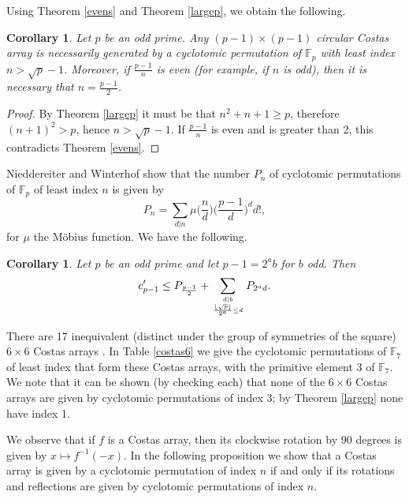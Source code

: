 \documentclass[10pt]{amsart}
\newtheorem{corollary}[theorem]{Corollary}
\newcommand{\comment}[1]{}
\begin{document}
Using Theorem \ref{evens} and Theorem \ref{largep}, we obtain the
following.

\begin{corollary}
Let $p$ be an odd prime. Any $(p-1)\times
(p-1)$ circular Costas array is necessarily generated by a cyclotomic permutation of
$\mathbb{F}_p$ with least index $n>\sqrt{p}-1$. Moreover, if
$\frac{p-1}{n}$ is even (for example, if $n$ is odd), then it is
necessary that $n=\frac{p-1}{2}$.
\end{corollary}
\begin{proof}
By Theorem \ref{largep} it must be that $n^2+n+1 \geq p$,
therefore $(n+1)^2 > p$, hence $n > \sqrt{p}-1$. If
$\frac{p-1}{n}$ is even and is greater than 2, this contradicts
Theorem \ref{evens}.
\end{proof}

Nieddereiter and Winterhof \cite{MR2143454} show that
the number $P_n$ of cyclotomic
permutations of $\mathbb{F}_p$ of least index $n$ is given by
\[
P_n=\sum_{d|n} \mu\Big(\frac{n}{d}\Big)\Big(\frac{p-1}{d}\Big)^d d!,
\]
for $\mu$ the M\"obius function. We have the following.

\begin{corollary}
Let $p$ be an odd prime and let $p-1=2^ab$ for $b$ odd. Then
\[
c_{p-1}' \leq P_{\frac{p-1}{2}} + \sum_{d|b \atop
\frac{\lfloor \sqrt{p}\rfloor }{2^a} \leq d} P_{2^a d}.
\]
\end{corollary}

\comment{
If $p \equiv 1 \pmod 4$, then
\[ c_{p-1} \leq  P_{\frac{p-1}{2}}
+\sum_{\substack{\lfloor \sqrt{p} \rfloor \leq 2n \leq
p-1\\2n|p-1}} P_{2n},
\] and if $p \equiv -1 \pmod 4$, then
\[ c_{p-1} \leq \sum_{\substack{\lfloor \sqrt{p} \rfloor \leq 2n \leq p-1\\2n|p-1}}  P_{2n}. \]
\end{corollary}}

There are 17 inequivalent (distinct under the group of symmetries
of the square) $6 \times 6$ Costas arrays \cite{golomb1984}. In
Table \ref{costas6} we give the cyclotomic permutations of
$\mathbb{F}_7$ of least index that form  these  Costas arrays, with the
primitive element 3 of $\mathbb{F}_7$.
We note that it can be shown (by checking each) that none of the
$6 \times 6$ Costas arrays are given by cyclotomic permutations of
index 3; by Theorem \ref{largep} none have index 1.

We observe that if $f$ is a Costas array, then
its clockwise rotation by 90 degrees is given by $x \mapsto f^{-1}(-x)$.
In the following proposition we show that a Costas array is given by a
cyclotomic
permutation of index $n$ if and only if its rotations and reflections are given
by cyclotomic permutations of index $n$.
\end{document}
